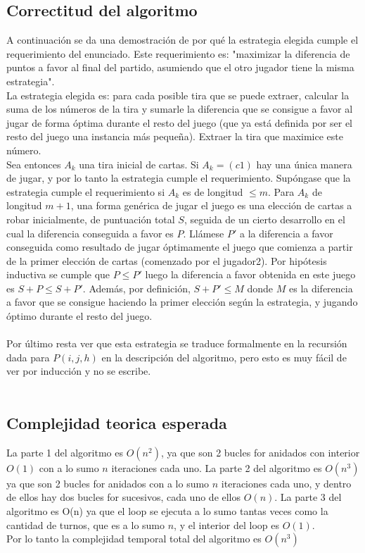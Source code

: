 \subsection{Correctitud del algoritmo}
A continuaci\'on se da una demostraci\'on de por qu\'e la estrategia elegida cumple el requerimiento del enunciado. Este requerimiento es: "maximizar la diferencia de puntos a favor al final del partido, asumiendo que el otro jugador tiene la misma estrategia".\\
La estrategia elegida es: para cada posible tira que se puede extraer, calcular la suma de los n\'umeros de la tira y sumarle la diferencia que se consigue a favor al jugar de forma \'optima durante el resto del juego (que ya est\'a definida por ser el resto del juego una instancia m\'as peque\~na). Extraer la tira que maximice este n\'umero.\\
Sea entonces $A_{k}$ una tira inicial de cartas. Si $A_{k}=(c1)$ hay una \'unica manera de jugar, y por lo tanto la estrategia cumple el requerimiento. Sup\'ongase que la estrategia cumple el requerimiento si $A_{k}$ es de longitud $\le m$. Para $A_{k}$ de longitud $m+1$, una forma gen\'erica de jugar el juego es una elecci\'on de cartas a robar inicialmente, de puntuaci\'on total $S$, seguida de un cierto desarrollo en el cual la diferencia conseguida a favor es $P$. Ll\'amese $P'$ a la diferencia a favor conseguida como resultado de jugar \'optimamente el juego que comienza a partir de la primer elecci\'on de cartas (comenzado por el jugador2). Por hip\'otesis inductiva se cumple que $P \le P'$ luego la diferencia a favor obtenida en este juego es $S+P \le S+P'$. Adem\'as, por definici\'on, $S+P' \le M$ donde $M$ es la diferencia a favor que se consigue haciendo la primer elecci\'on seg\'un la estrategia, y jugando \'optimo durante el resto del juego.\\
\\
 Por \'ultimo resta ver que esta estrategia se traduce formalmente en la recursi\'on dada para $P(i,j,h)$ en la descripci\'on del algoritmo, pero esto es muy f\'acil de ver por inducci\'on y no se escribe.\\
\\

\subsection{Complejidad teorica esperada}
La parte 1 del algoritmo es $O(n^{2})$, ya que son 2 bucles for anidados con interior $O(1)$ con a lo sumo $n$ iteraciones cada uno.
La parte 2 del algoritmo es $O(n^{3})$ ya que son 2 bucles for anidados con a lo sumo $n$ iteraciones cada uno, y dentro de ellos hay dos bucles for sucesivos, cada uno de ellos $O(n)$.
La parte 3 del algoritmo es O(n) ya que el loop se ejecuta a lo sumo tantas veces como la cantidad de turnos, que es a lo sumo $n$, y el interior del loop es $O(1)$.\\
Por lo tanto la complejidad temporal total del algoritmo es $O(n^3)$

